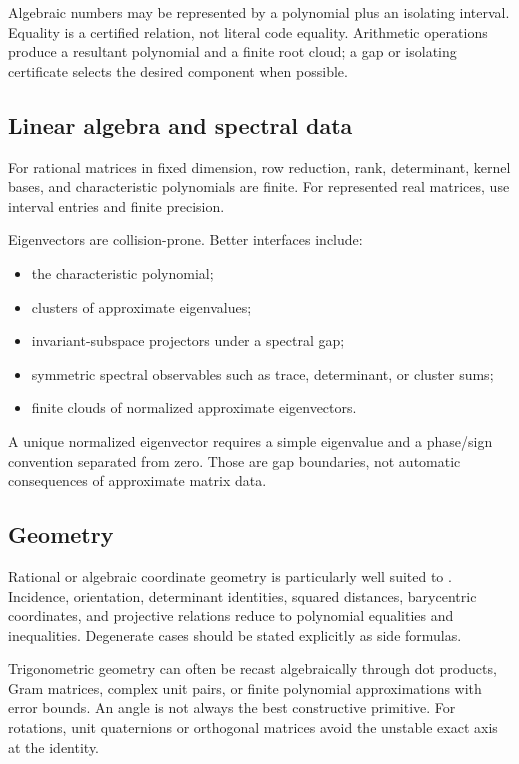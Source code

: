 Algebraic numbers may be represented by a polynomial plus an isolating interval.  Equality is a certified relation, not literal code equality.  Arithmetic operations produce a resultant polynomial and a finite root cloud; a gap or isolating certificate selects the desired component when possible.

\subsection{Linear algebra and spectral data}

For rational matrices in fixed dimension, row reduction, rank, determinant, kernel bases, and characteristic polynomials are finite.  For represented real matrices, use interval entries and finite precision.

Eigenvectors are collision-prone.  Better interfaces include:
\begin{itemize}
\item the characteristic polynomial;
\item clusters of approximate eigenvalues;
\item invariant-subspace projectors under a spectral gap;
\item symmetric spectral observables such as trace, determinant, or cluster sums;
\item finite clouds of normalized approximate eigenvectors.
\end{itemize}
A unique normalized eigenvector requires a simple eigenvalue and a phase/sign convention separated from zero.  Those are gap boundaries, not automatic consequences of approximate matrix data.

\subsection{Geometry}

Rational or algebraic coordinate geometry is particularly well suited to \iPRA.  Incidence, orientation, determinant identities, squared distances, barycentric coordinates, and projective relations reduce to polynomial equalities and inequalities.  Degenerate cases should be stated explicitly as side formulas.

Trigonometric geometry can often be recast algebraically through dot products, Gram matrices, complex unit pairs, or finite polynomial approximations with error bounds.  An angle is not always the best constructive primitive.  For rotations, unit quaternions or orthogonal matrices avoid the unstable exact axis at the identity.

